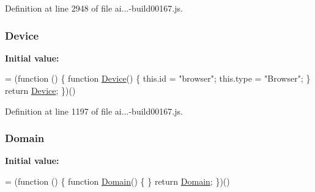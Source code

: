 Definition at line 2948 of file ai...-\/build00167.\+js.

\subsubsection[{\texorpdfstring{Device}{Device}}]{ Device}\hypertarget{obj_2_release_2_package_2_package_tmp_2_scripts_2ai_80_822_89-build00167_8js_a8a8c87708717f319fc6104f268130638}{}\label{obj_2_release_2_package_2_package_tmp_2_scripts_2ai_80_822_89-build00167_8js_a8a8c87708717f319fc6104f268130638}
{\bfseries Initial value\+:}
\begin{DoxyCode}
= (\textcolor{keyword}{function} () \{
                \textcolor{keyword}{function} \hyperlink{obj_2_release_2_package_2_package_tmp_2_scripts_2ai_80_822_89-build00167_8js_a8a8c87708717f319fc6104f268130638}{Device}() \{
                    this.\textcolor{keywordtype}{id} = \textcolor{stringliteral}{"browser"};
                    this.type = \textcolor{stringliteral}{"Browser"};
                \}
                \textcolor{keywordflow}{return} \hyperlink{obj_2_release_2_package_2_package_tmp_2_scripts_2ai_80_822_89-build00167_8js_a8a8c87708717f319fc6104f268130638}{Device};
            \})()
\end{DoxyCode}


Definition at line 1197 of file ai...-\/build00167.\+js.

\subsubsection[{\texorpdfstring{Domain}{Domain}}]{ Domain}\hypertarget{obj_2_release_2_package_2_package_tmp_2_scripts_2ai_80_822_89-build00167_8js_a0178ef80afcba95b4ff5882194185f95}{}\label{obj_2_release_2_package_2_package_tmp_2_scripts_2ai_80_822_89-build00167_8js_a0178ef80afcba95b4ff5882194185f95}
{\bfseries Initial value\+:}
\begin{DoxyCode}
= (\textcolor{keyword}{function} () \{
            \textcolor{keyword}{function} \hyperlink{obj_2_release_2_package_2_package_tmp_2_scripts_2ai_80_822_89-build00167_8js_a0178ef80afcba95b4ff5882194185f95}{Domain}() \{
            \}
            \textcolor{keywordflow}{return} \hyperlink{obj_2_release_2_package_2_package_tmp_2_scripts_2ai_80_822_89-build00167_8js_a0178ef80afcba95b4ff5882194185f95}{Domain};
        \})()
\end{DoxyCode}


